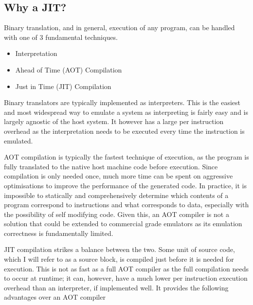 \subsection{Why a JIT?}

Binary translation, and in general, execution of any program, can be handled with one of 3 fundamental techniques.

\begin{itemize}
    \item Interpretation
    \item Ahead of Time (AOT) Compilation
    \item Just in Time (JIT) Compilation
\end{itemize}

Binary translators are typically implemented as interpreters. This is the easiest and most widespread way to emulate a system as interpreting is fairly easy and is largely agnostic of the host system. It however has a large per instruction overhead as the interpretation needs to be executed every time the instruction is emulated.

AOT compilation is typically the fastest technique of execution, as the program is fully translated to the native host machine code before execution. Since compilation is only needed once, much more time can be spent on aggressive optimisations to improve the performance of the generated code. In practice, it is impossible to statically and comprehensively determine which contents of a program correspond to instructions and what corresponds to data, especially with the possibility of self modifying code. Given this, an AOT compiler is not a solution that could be extended to commercial grade emulators as its emulation correctness is fundamentally limited.

JIT compilation strikes a balance between the two. Some unit of source code, which I will refer to as a source block, is compiled just before it is needed for execution. This is not as fast as a full AOT compiler as the full compilation needs to occur at runtime; it can, however, have a much lower per instruction execution overhead than an interpreter, if implemented well. It provides the following advantages over an AOT compiler

